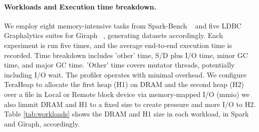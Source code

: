 \paragraph{Workloads and Execution time breakdown.} We employ eight memory-intensive tasks from Spark-Bench ~\cite{spark} and five LDBC Graphalytics suites for Giraph ~\cite{giraph}, generating datasets accordingly. Each experiment is run five times, and the average end-to-end execution time is recorded. Time breakdown includes 'other' time, S/D plus I/O time, minor GC time, and major GC time. 'Other' time covers mutator threads, potentially including I/O wait. The profiler operates with minimal overhead. We configure TeraHeap to allocate the first heap (H1) on DRAM and the second heap (H2) over a file in Local or Remote block device via memory-mapped I/O (mmio) we also limmit DRAM and H1 to a fixed size to create pressure and more I/O to H2. Table \ref{tab:workloads} shows the DRAM and H1 size in each workload, in Spark and Giraph, accordingly.
\begin{table}[H]
\centering
{}
\caption{Teraheap workload configuration table.}
\label{tab:workloads}
\end{table}
